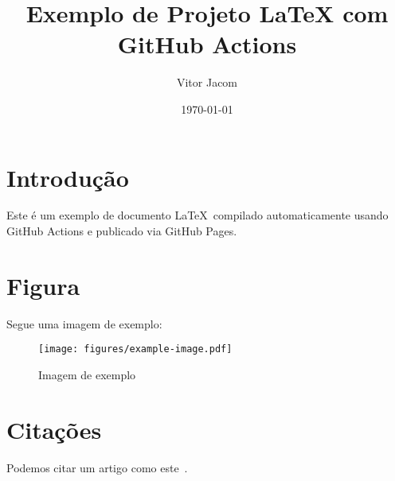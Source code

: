 \documentclass[12pt]{article}
\title{Exemplo de Projeto LaTeX com GitHub Actions}
\author{Vitor Jacom}
\date{\today}
\begin{document}
\maketitle

\section{Introdução}
Este é um exemplo de documento \LaTeX~compilado automaticamente usando GitHub Actions e publicado via GitHub Pages.

\section{Figura}
Segue uma imagem de exemplo:

\begin{figure}[h!]
\centering
\texttt{[image: figures/example-image.pdf]}
\caption{Imagem de exemplo}
\end{figure}

\section{Citações}
Podemos citar um artigo como este~\cite{knuth1984texbook}.

\printbibliography
\end{document}
